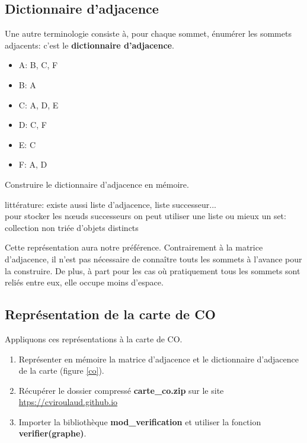 \documentclass[a4paper,11pt]{article}
\begin{document}
\begin{Form}
\subsection{Dictionnaire d'adjacence}
Une autre terminologie consiste à, pour chaque sommet, énumérer les sommets adjacents: c'est le \textbf{dictionnaire d'adjacence}.
\begin{itemize}
\item A: B, C, F
\item B: A
\item C: A, D, E
\item D: C, F
\item E: C
\item F: A, D
\end{itemize}
\begin{activite}
Construire le dictionnaire d'adjacence en mémoire.
\end{activite}
\begin{commentprof}
littérature: existe aussi liste d'adjacence, liste successeur...\\
pour stocker les nœuds successeurs on peut utiliser une liste ou mieux un set: collection non triée d'objets distincts
\end{commentprof}
Cette représentation aura notre préférence. Contrairement à la matrice d'adjacence, il n'est pas nécessaire de connaître touts les sommets à l'avance pour la construire. De plus, à part pour les cas où pratiquement tous les sommets sont reliés entre eux, elle occupe moins d'espace.
\subsection{Représentation de la carte de CO}
Appliquons ces représentations à la carte de CO. 
\begin{activite}
\begin{enumerate}
\item Représenter en mémoire la matrice d'adjacence et le dictionnaire d'adjacence de la carte (figure \ref{co}).
\item Récupérer le dossier compressé \textbf{carte\_co.zip} sur le site \url{htps://cviroulaud.github.io}
\item Importer la bibliothèque \textbf{mod\_verification} et utiliser la fonction \textbf{verifier(graphe)}.
\end{enumerate}
\end{activite}

\end{Form}
\end{document}

